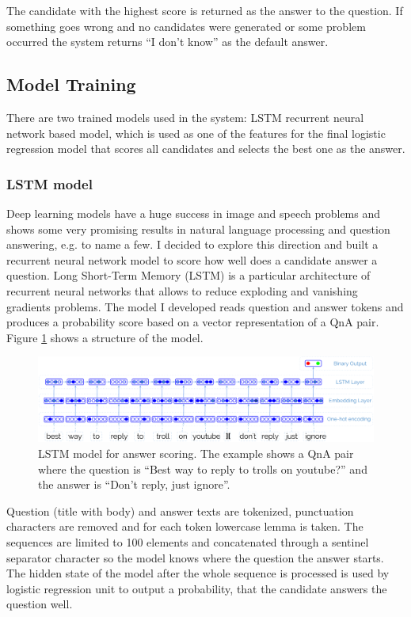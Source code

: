 \documentclass[]{article}
\begin{document}
The candidate with the highest score is returned as the answer to the question.
If something goes wrong and no candidates were generated or some problem occurred the system returns ``I don't know'' as the default answer.

\subsection{Model Training}

There are two trained models used in the system: LSTM recurrent neural network based model, which is used as one of the features for the final logistic regression model that scores all candidates and selects the best one as the answer.

\subsubsection{LSTM model}
\label{section:lstm}

Deep learning models have a huge success in image and speech problems and shows some very promising results in natural language processing and question answering, e.g. \cite{yu2014deep,diwang_lstm_2015} to name a few.
I decided to explore this direction and built a recurrent neural network model to score how well does a candidate answer a question.
Long Short-Term Memory (LSTM) \cite{hochreiter1997long} is a particular architecture of recurrent neural networks that allows to reduce exploding and vanishing gradients problems.
The model I developed reads question and answer tokens and produces a probability score based on a vector representation of a QnA pair.
Figure \ref{figure:lstm_model} shows a structure of the model.

\begin{figure}
	\includegraphics[width=470px]{img/qa_lstm}
	\caption{LSTM model for answer scoring. The example shows a QnA pair where the question is ``Best way to reply to trolls on youtube?'' and the answer is ``Don't reply, just ignore''.}
	\label{figure:lstm_model}
\end{figure}

Question (title with body) and answer texts are tokenized, punctuation characters are removed and for each token lowercase lemma is taken.
The sequences are limited to 100 elements and concatenated through a sentinel separator character so the model knows where the question the answer starts.
The hidden state of the model after the whole sequence is processed is used by logistic regression unit to output a probability, that the candidate answers the question well.
\end{document}

